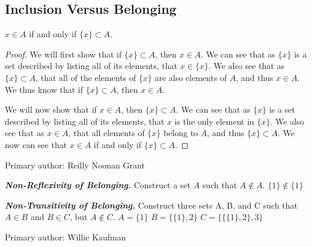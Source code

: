\subsection{Inclusion Versus Belonging}%
            \begin{majorEx}%
            $x \in A$ if and only if $\{x\} \subset A$.
            \end{majorEx}

\begin{proof} We will first show that if $\{x\} \subset A$, then $x \in A$. We can see that as $\{x\}$ is a set described by listing all of its elements, that $x \in \{x\}$. We also see that
as $\{x\} \subset A$, that all of the elements of $\{x\}$ are also elements of $A$, and thus $x \in A$. We thus know that if $\{x\} \subset A$, then $x \in A$.

We will now show that if $x \in A$, then $\{x\} \subset A$. We can see that as $\{x\}$ is a set described by listing all of its elements, that $x$ is the only element in $\{x\}$.
We also see that as $x \in A$, that all elements of $\{ x\}$ belong to $A$, and thus $\{x\} \subset A$. We now can see that $x \in A$ if and only if $\{x\} \subset A$.
\end{proof}
Primary author: Reilly Noonan Grant			
            \begin{majorEx}%
            \textbf{\textit{Non-Reflexivity of Belonging.}} Construct a set $A$ such that $A \not\in A$.
            \newline $\{1\} \not\in \{1\}$
            \end{majorEx}
            
\begin{majorEx}%
            \textbf{\textit{Non-Transitivity of Belonging.}} Construct three sets A, B, and C such that $A \in B$ and $B \in C$, but $A \not \in C$.
            \newline $A = \{1\}$
            \newline $B = \{\{1\}, 2\}$
            \newline $C = \{\{\{1\}, 2\}, 3\}$
            \newline
            \end{majorEx}
            
Primary author: Willie Kaufman
